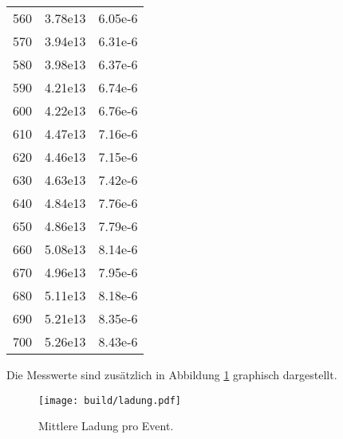 \begin{table}
\begin{tabular}{S[table-format=3.0] S[table-format=1.2e2] S[table-format=1.2e2]}
560     & 3.78e13       & 6.05e-6\\
570     & 3.94e13       & 6.31e-6\\
580     & 3.98e13       & 6.37e-6\\
590     & 4.21e13       & 6.74e-6\\
600     & 4.22e13       & 6.76e-6\\
610     & 4.47e13       & 7.16e-6\\
620     & 4.46e13       & 7.15e-6\\
630     & 4.63e13       & 7.42e-6\\
640     & 4.84e13       & 7.76e-6\\
650     & 4.86e13       & 7.79e-6\\
660     & 5.08e13       & 8.14e-6\\
670     & 4.96e13       & 7.95e-6\\
680     & 5.11e13       & 8.18e-6\\
690     & 5.21e13       & 8.35e-6\\
700     & 5.26e13       & 8.43e-6\\
        \bottomrule
    \end{tabular}
\end{table}
\noindent
Die Messwerte sind zusätzlich in Abbildung \ref{fig:ladung} graphisch dargestellt.
\begin{figure}[H]
  \centering
  \texttt{[image: build/ladung.pdf]}
  \caption{Mittlere Ladung pro Event.}
  \label{fig:ladung}
\end{figure}
